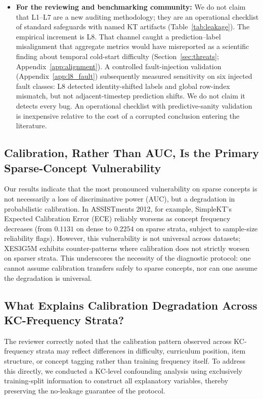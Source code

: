 \begin{itemize}
    \item \textbf{For the reviewing and benchmarking community:} We do not claim that L1--L7 are a new auditing methodology; they are an operational checklist of standard safeguards with named KT artifacts (Table~\ref{tab:leakage}). The empirical increment is L8. That channel caught a prediction--label misalignment that aggregate metrics would have misreported as a scientific finding about temporal cold-start difficulty (Section~\ref{sec:threats}; Appendix~\ref{app:alignment}). A controlled fault-injection validation (Appendix~\ref{app:l8_fault}) subsequently measured sensitivity on six injected fault classes: L8 detected identity-shifted labels and global row-index mismatch, but not adjacent-timestep prediction shifts. We do not claim it detects every bug. An operational checklist with predictive-sanity validation is inexpensive relative to the cost of a corrupted conclusion entering the literature.
\end{itemize}

\subsection{Calibration, Rather Than AUC, Is the Primary Sparse-Concept Vulnerability}
Our results indicate that the most pronounced vulnerability on sparse concepts is not necessarily a loss of discriminative power (AUC), but a degradation in probabilistic calibration. In ASSISTments 2012, for example, SimpleKT's Expected Calibration Error (ECE) reliably worsens as concept frequency decreases (from $0.1131$ on dense to $0.2254$ on sparse strata, subject to sample-size reliability flags). However, this vulnerability is not universal across datasets; XES3G5M exhibits counter-patterns where calibration does not strictly worsen on sparser strata. This underscores the necessity of the diagnostic protocol: one cannot assume calibration transfers safely to sparse concepts, nor can one assume the degradation is universal.

\subsection{What Explains Calibration Degradation Across KC-Frequency Strata?}
\label{sec:a4_confounding}

The reviewer correctly noted that the calibration pattern observed across KC-frequency strata may reflect differences in difficulty, curriculum position, item structure, or concept tagging rather than training frequency itself.
To address this directly, we conducted a KC-level confounding analysis using exclusively training-split information to construct all explanatory variables, thereby preserving the no-leakage guarantee of the protocol.

